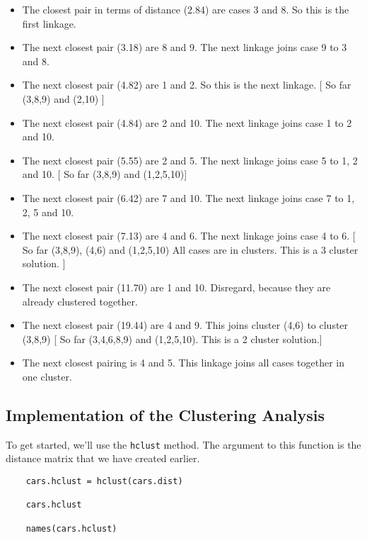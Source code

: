 \documentclass[12pt]{article}
\begin{document}
\begin{itemize}
	\item The closest pair in terms of distance (2.84) are cases 3 and 8. So this is the first linkage.
	\item The next closest pair (3.18) are 8 and 9. The next linkage joins case 9 to 3 and 8.
	\item The next closest pair (4.82) are 1 and 2. So this is the next linkage. [ So far (3,8,9) and (2,10) ] 
	\item The next closest pair (4.84) are 2 and 10. The next linkage joins case 1 to 2 and 10.
	\item The next closest pair (5.55) are 2 and 5. The next linkage joins case 5 to 1, 2 and 10. [ So far (3,8,9) and (1,2,5,10)]
	\item The next closest pair (6.42) are 7 and 10. The next linkage joins case 7 to 1, 2, 5 and 10.
	\item The next closest pair (7.13) are 4 and 6. The next linkage joins case 4 to 6. [ So far (3,8,9), (4,6) and (1,2,5,10) All cases are in clusters. This is a 3 cluster solution. ]
	\item The next closest pair (11.70) are 1 and 10. Disregard, because they are already clustered together.
	\item The next closest pair (19.44) are 4 and 9. This joins cluster (4,6) to cluster (3,8,9) [ So far (3,4,6,8,9) and (1,2,5,10). This is a 2 cluster solution.]
	\item The next closest pairing is 4 and 5. This linkage joins all cases together in one cluster.
\end{itemize}
\newpage

\subsection{Implementation of the Clustering Analysis}
To get started, we'll use the \texttt{hclust} method. The argument to this function is the distance matrix that we have created earlier.
\begin{framed}
	\begin{verbatim}
	cars.hclust = hclust(cars.dist)
	
	cars.hclust
	
	names(cars.hclust)
	\end{verbatim}
\end{framed}
\end{document}
